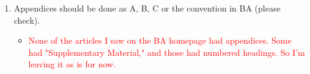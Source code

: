 \documentclass[letterpaper, parskip]{scrartcl}
\begin{document}
\begin{enumerate}
\item Appendices should be done as A, B, C or the convention in BA (please check). 
\begin{itemize}
	\item \textcolor{red}{None of the articles I saw on the BA homepage had appendices. Some had "Supplementary Material," and those had numbered headings. So I'm leaving it as is for now. }
\end{itemize}


\end{enumerate}
\end{document}
